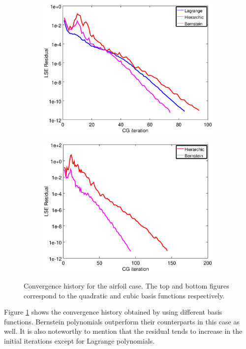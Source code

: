 \documentclass[letter,12pt]{article}
\begin{document}
\begin{figure}
  \centering
  \begin{subfigure}{0.65\textwidth}
    \includegraphics[width=.95\linewidth,center]{bump-second-convergence.eps}
  \end{subfigure}
  \begin{subfigure}{0.65\textwidth}
    \includegraphics[width=.95\linewidth,center]{bump-third-convergence.eps}
  \end{subfigure}
  \caption{Convergence history for the airfoil case. The top and
    bottom figures correspond to the quadratic and cubic basis
    functions respectively.}
  \label{fig:bump-conv}
\end{figure}

Figure \ref{fig:bump-conv} shows the convergence history obtained by
using different basis functions. Bernstein polynomials outperform
their counterparts in this case as well. It is also noteworthy to
mention that the residual tends to increase in the initial iterations
except for Lagrange polynomials.
\end{document}
